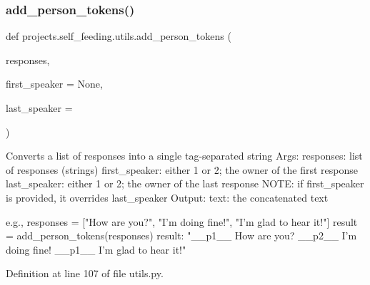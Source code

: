 \subsubsection{\texorpdfstring{add\+\_\+person\+\_\+tokens()}{add\_person\_tokens()}}
{\footnotesize\ttfamily def projects.\+self\+\_\+feeding.\+utils.\+add\+\_\+person\+\_\+tokens (\begin{DoxyParamCaption}\item[{}]{responses,  }\item[{}]{first\+\_\+speaker = {\ttfamily None},  }\item[{}]{last\+\_\+speaker = {} }\end{DoxyParamCaption})}

\begin{DoxyVerb}Converts a list of responses into a single tag-separated string
Args:
    responses: list of responses (strings)
    first_speaker: either 1 or 2; the owner of the first response
    last_speaker: either 1 or 2; the owner of the last response
        NOTE: if first_speaker is provided, it overrides last_speaker
Output:
    text: the concatenated text

e.g.,
responses = ["How are you?", "I'm doing fine!", "I'm glad to hear it!"]
result = add_person_tokens(responses)
result: "__p1__ How are you? __p2__ I'm doing fine! __p1__ I'm glad to
    hear it!"
\end{DoxyVerb}
 

Definition at line 107 of file utils.\+py.


